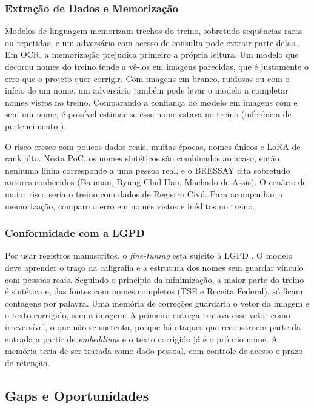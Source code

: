 \documentclass[12pt,a4paper]{article}
\begin{document}
\subsubsection{Extração de Dados e Memorização}
Modelos de linguagem memorizam trechos do treino, sobretudo sequências raras ou repetidas, e um adversário com acesso de consulta pode extrair parte delas \cite{carlini2021extracting}. Em OCR, a memorização prejudica primeiro a própria leitura. Um modelo que decorou nomes do treino tende a vê-los em imagens parecidas, que é justamente o erro que o projeto quer corrigir. Com imagens em branco, ruidosas ou com o início de um nome, um adversário também pode levar o modelo a completar nomes vistos no treino. Comparando a confiança do modelo em imagens com e sem um nome, é possível estimar se esse nome estava no treino (inferência de pertencimento \cite{shokri2017membership}).

O risco cresce com poucos dados reais, muitas épocas, nomes únicos e LoRA de rank alto. Nesta PoC, os nomes sintéticos são combinados ao acaso, então nenhuma linha corresponde a uma pessoa real, e o BRESSAY cita sobretudo autores conhecidos (Bauman, Byung-Chul Han, Machado de Assis). O cenário de maior risco seria o treino com dados de Registro Civil. Para acompanhar a memorização, comparo o erro em nomes vistos e inéditos no treino.

\subsubsection{Conformidade com a LGPD}
Por usar registros manuscritos, o \emph{fine-tuning} está sujeito à LGPD \cite{lgpd2018}. O modelo deve aprender o traço da caligrafia e a estrutura dos nomes sem guardar vínculo com pessoas reais. Seguindo o princípio da minimização, a maior parte do treino é sintética e, das fontes com nomes completos (TSE e Receita Federal), só ficam contagens por palavra. Uma memória de correções guardaria o vetor da imagem e o texto corrigido, sem a imagem. A primeira entrega tratava esse vetor como irreversível, o que não se sustenta, porque há ataques que reconstroem parte da entrada a partir de \emph{embeddings} e o texto corrigido já é o próprio nome. A memória teria de ser tratada como dado pessoal, com controle de acesso e prazo de retenção.

\subsection{Gaps e Oportunidades}
\end{document}
